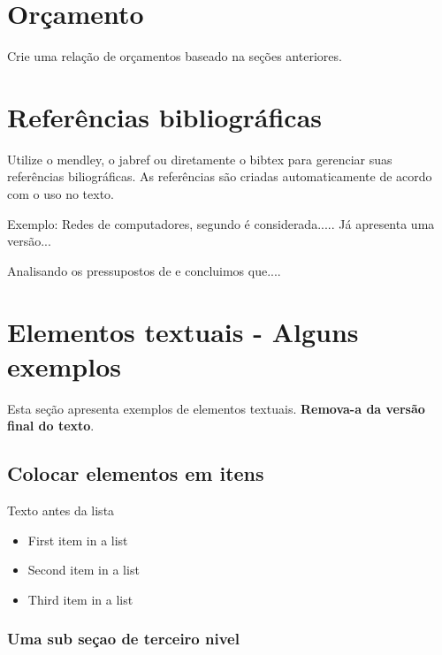 \documentclass[	DIV=calc,%
							paper=a4,%
							fontsize=12pt,%
							onecolumn]{scrartcl}	 					%
\begin{document}
\section{Orçamento}
Crie uma relação de orçamentos baseado na seções anteriores.

\section{Referências bibliográficas}
Utilize o mendley, o jabref ou diretamente o bibtex para gerenciar suas referências biliográficas. As referências são criadas automaticamente de acordo com o uso no texto.

Exemplo: Redes de computadores, segundo \cite{t2013} é considerada..... Já \cite{kurose2010} apresenta uma versão...

Analisando os pressupostos de \cite{ref3} e \cite{ref4} concluimos que....


\renewcommand\refname{} %

  


\section{Elementos textuais - Alguns exemplos}

Esta seção apresenta exemplos de elementos textuais. \textbf{Remova-a da versão final do texto}.


\subsection{Colocar elementos em itens}

Texto antes da lista

\begin{itemize}
	\item First item in a list 
	\item Second item in a list 
	\item Third item in a list
\end{itemize}

\subsubsection{Uma sub seçao de terceiro nivel}
\end{document}
